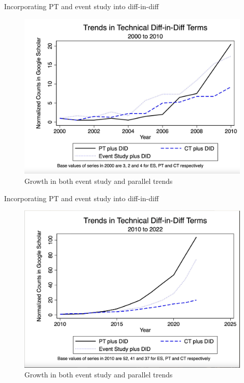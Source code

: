 \documentclass{beamer}
\begin{document}
\begin{frame}{Incorporating PT and event study into diff-in-diff}

	\begin{figure}
	\caption{Growth in both event study and parallel trends}
	\includegraphics[scale=0.2]{./lecture_includes/espt_2}
	\end{figure}


\end{frame}

\begin{frame}{Incorporating PT and event study into diff-in-diff}

	\begin{figure}
	\caption{Growth in both event study and parallel trends}
	\includegraphics[scale=0.2]{./lecture_includes/espt_3}
	\end{figure}


\end{frame}
\end{document}
